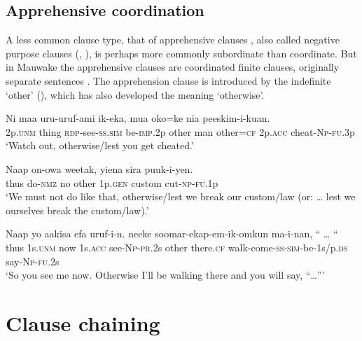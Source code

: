 \subsection{Apprehensive coordination} \label{sec:8.1.6}

A less common clause type, that of apprehensive clauses \citep[61]{Roberts1987}, also called negative purpose clauses (\citealt[444]{Haiman1980}, \citealt[188]{ThompsonEtAl1985}), is perhaps more commonly subordinate than coordinate. But in Mauwake the apprehensive clauses are coordinated finite clauses, originally separate sentences . The apprehension clause is introduced by the indefinite  `other' (), which has also developed the meaning `otherwise'.  

\ea%
\label{ex:8:x1426}
\gll Ni  maa  uru-uruf-ami  ik-eka,    mua  oko=ke nia  peeskim-i-kuan.\\
2p.\textsc{unm} thing \textsc{rdp}-see-\textsc{ss}.\textsc{sim}  be-\textsc{imp}.2p  other  man  other=\textsc{cf} 2p.\textsc{acc}  cheat-\textsc{Np}-\textsc{fu}.3p\\
\glt`Watch out, otherwise/lest you get cheated.'
\z


\ea%
\label{ex:8:x1427}
\gll Naap  on-owa  weetak,   yiena  sira  puuk-i-yen. \\
thus  do-\textsc{nmz} no other 1p.\textsc{gen} custom  cut-\textsc{np}-\textsc{fu}.1p\\
\glt`We must not do like that, otherwise/lest we break our custom/law (or: {\dots} lest we ourselves break the custom/law).'
\z


\ea%
\label{ex:8:x1428}
\gll Naap  yo  aakisa  efa  uruf-i-n.   neeke soomar-ekap-em-ik-omkun  ma-i-nan,  ``  {\dots } ``\\
thus  1s.\textsc{unm} now 1s.\textsc{acc} see-\textsc{Np}-\textsc{pr}.2s other there.\textsc{cf} walk-come-\textsc{ss}-\textsc{sim}-be-1s/p.\textsc{ds} say-\textsc{Np}-\textsc{fu}.2s\\
\glt`So you see me now. Otherwise I'll be walking there and you will say, ``{\dots}'''
\z
{}


\section{Clause chaining} \label{sec:8.2}

